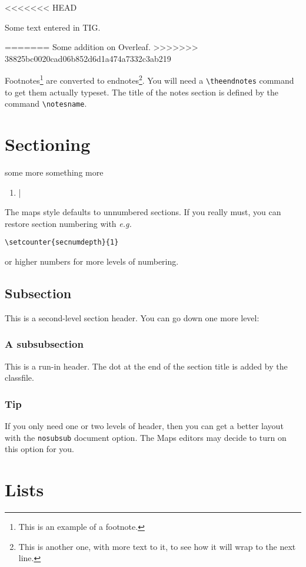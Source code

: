 \documentclass[nosubsub]{maps}
\renewcommand{\notesname}{Footnotes}
\begin{document}
<<<<<<< HEAD

Some text entered in TIG.

=======
Some addition on Overleaf.
>>>>>>> 38825bc0020cad06b852d6d1a474a7332c3ab219

\newpage
Footnotes\footnote{This is an example of a footnote.}  are converted
to endnotes\footnote{This is another one, with more text to it, to
see how it will wrap to the next line.}. You will need a
\verb+\theendnotes+ command to get them actually typeset. The title
of the notes section is defined by the command \verb+\notesname+.

\section{Sectioning}

some more
something more
\begin{enumerate}
    \item |
\end{enumerate}

The maps style defaults to unnumbered sections. If you really must,
you can restore section numbering with \emph{e.g.}
\begin{verbatim}
\setcounter{secnumdepth}{1}
\end{verbatim}
or higher numbers for more levels of numbering.

\subsection{Subsection}
This is a second-level section header. You can go down one more
level:

\subsubsection{A subsubsection}

This is a run-in header. The dot at the end of the section title is
added by the classfile.

\subsubsection{Tip}
If you only need one or two levels of header, then you can get a
better layout with the \texttt{nosubsub} document option.
The Maps editors may decide to turn on this option for you.

\section{Lists}
\end{document}
